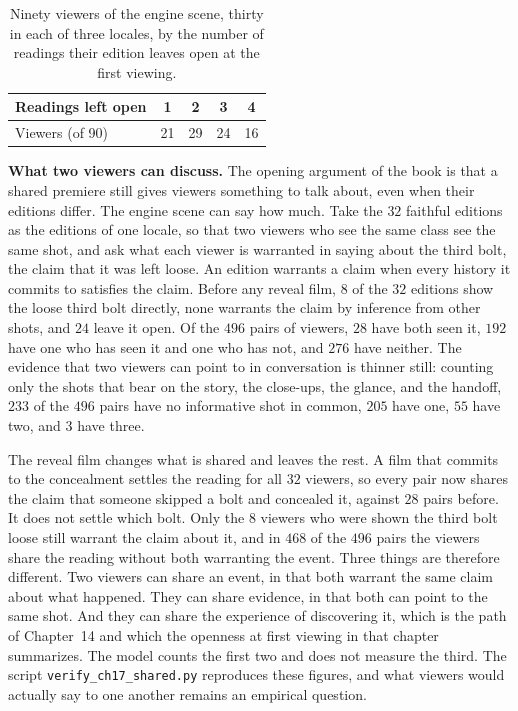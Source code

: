 \documentclass[11pt,twoside,openright]{book}
\theoremstyle{plain}
\theoremstyle{definition}
\theoremstyle{remark}
\begin{document}
\begin{table}[ht]
\centering
\begin{tabular}{@{}lcccc@{}}
\toprule
Readings left open & 1 & 2 & 3 & 4\\
\midrule
Viewers (of 90) & 21 & 29 & 24 & 16\\
\bottomrule
\end{tabular}
\caption{Ninety viewers of the engine scene, thirty in each of three locales, by the number of readings their edition leaves open at the first viewing.}\label{tab:eng17}
\end{table}

\textbf{What two viewers can discuss.} The opening argument of the book is that a shared premiere still gives viewers something to talk about, even when their editions differ. The engine scene can say how much. Take the $32$ faithful editions as the editions of one locale, so that two viewers who see the same class see the same shot, and ask what each viewer is warranted in saying about the third bolt, the claim that it was left loose. An edition warrants a claim when every history it commits to satisfies the claim. Before any reveal film, $8$ of the $32$ editions show the loose third bolt directly, none warrants the claim by inference from other shots, and $24$ leave it open. Of the $496$ pairs of viewers, $28$ have both seen it, $192$ have one who has seen it and one who has not, and $276$ have neither. The evidence that two viewers can point to in conversation is thinner still: counting only the shots that bear on the story, the close-ups, the glance, and the handoff, $233$ of the $496$ pairs have no informative shot in common, $205$ have one, $55$ have two, and $3$ have three.

The reveal film changes what is shared and leaves the rest. A film that commits to the concealment settles the reading for all $32$ viewers, so every pair now shares the claim that someone skipped a bolt and concealed it, against $28$ pairs before. It does not settle which bolt. Only the $8$ viewers who were shown the third bolt loose still warrant the claim about it, and in $468$ of the $496$ pairs the viewers share the reading without both warranting the event. Three things are therefore different. Two viewers can share an event, in that both warrant the same claim about what happened. They can share evidence, in that both can point to the same shot. And they can share the experience of discovering it, which is the path of Chapter~14 and which the openness at first viewing in that chapter summarizes. The model counts the first two and does not measure the third. The script \texttt{verify\_ch17\_shared.py} reproduces these figures, and what viewers would actually say to one another remains an empirical question.
\end{document}
